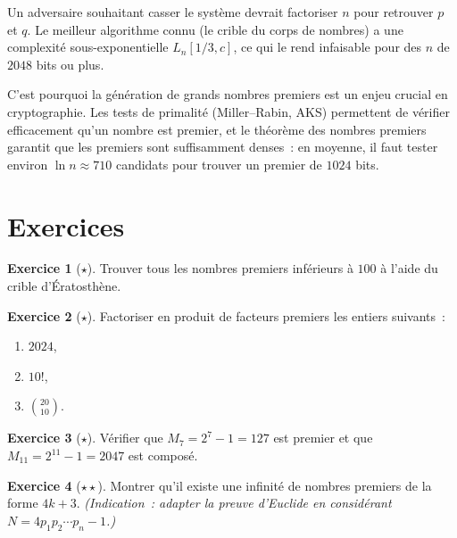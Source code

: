 \documentclass[12pt,a4paper,openany]{book}
\theoremstyle{definition}
\newtheorem{exercice}{Exercice}[chapter]
\theoremstyle{plain}
\theoremstyle{remark}
\begin{document}
Un adversaire souhaitant casser le système devrait factoriser $n$ pour retrouver $p$
et $q$. Le meilleur algorithme connu (le crible du corps de
nombres) a une complexité sous-exponentielle
$L_n[1/3, c]$, ce qui le rend infaisable pour des $n$ de $2048$ bits ou plus.

C'est pourquoi la génération de grands nombres premiers est un enjeu crucial en
cryptographie. Les tests de primalité (Miller--Rabin,
AKS) permettent de vérifier efficacement qu'un nombre
est premier, et le théorème des nombres premiers garantit que les premiers sont
suffisamment denses~: en moyenne, il faut tester environ $\ln n \approx 710$ candidats
pour trouver un premier de $1024$ bits.

\section{Exercices}
\label{sec:ch2:exercices}

\begin{exercice}[$\star$]
\label{exo:ch2:premiers_100}
Trouver tous les nombres premiers inférieurs à $100$ à l'aide du crible
d'Ératosthène.
\end{exercice}

\begin{exercice}[$\star$]
\label{exo:ch2:factoriser}
Factoriser en produit de facteurs premiers les entiers suivants~:
\begin{enumerate}[label=(\alph*)]
  \item $2024$,
  \item $10!$,
  \item $\binom{20}{10}$.
\end{enumerate}
\end{exercice}

\begin{exercice}[$\star$]
\label{exo:ch2:mersenne}
Vérifier que $M_7 = 2^7 - 1 = 127$ est premier et que $M_{11} = 2^{11} - 1 = 2047$
est composé.
\end{exercice}

\begin{exercice}[$\star\star$]
\label{exo:ch2:infinitude_4k3}
Montrer qu'il existe une infinité de nombres premiers de la forme $4k + 3$.
\textit{(Indication~: adapter la preuve d'Euclide en considérant $N = 4p_1 p_2
\cdots p_n - 1$.)}
\end{exercice}
\end{document}
